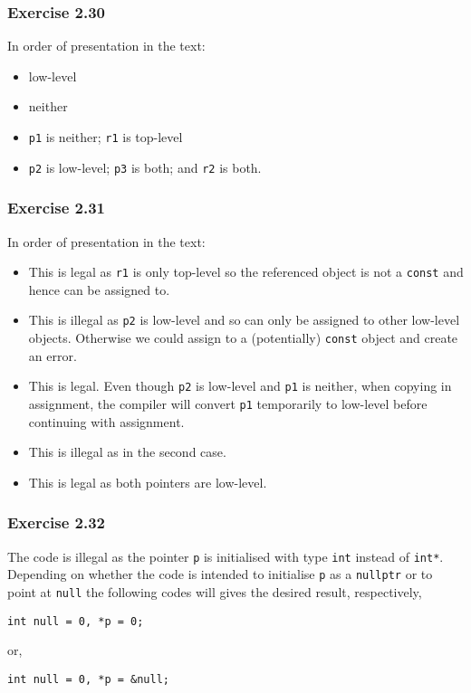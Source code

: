 \documentclass[12pt, a4paper]{article}
\begin{document}
\subsubsection*{Exercise 2.30}
In order of presentation in the text:
\begin{itemize}
	\item low-level
	\item neither
	\item \texttt{p1} is neither; \texttt{r1} is top-level
	\item \texttt{p2} is low-level; \texttt{p3} is both; and \texttt{r2} is both.
\end{itemize}

\subsubsection*{Exercise 2.31}
In order of presentation in the text:
\begin{itemize}
	\item 
		This is legal as \texttt{r1} is only top-level so the referenced object is not a \texttt{const} and hence can be assigned to.
	\item 
		This is illegal as \texttt{p2} is low-level and so can only be assigned to other low-level objects. Otherwise we could assign to a (potentially) \texttt{const} object and create an error.
	\item 
		This is legal. Even though \texttt{p2} is low-level and \texttt{p1} is neither, when copying in assignment, the compiler will convert \texttt{p1} temporarily to low-level before continuing with assignment.
	\item 
		This is illegal as in the second case.
	\item 
		This is legal as both pointers are low-level.
\end{itemize}

\subsubsection*{Exercise 2.32}
The code is illegal as the pointer \texttt{p} is initialised with type \texttt{int} instead of \texttt{int*}. Depending on whether the code is intended to initialise \texttt{p} as a \texttt{nullptr} or to point at \texttt{null} the following codes will gives the desired result, respectively,
\begin{center}
	\texttt{int null = 0, *p = 0;}
\end{center}
or,
\begin{center}
	\texttt{int null = 0, *p = \&null;}
\end{center}
\end{document}
